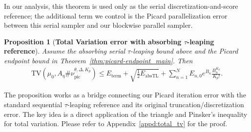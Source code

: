 \documentclass{article}
\newtheorem{proposition}{Proposition}[section]
\newcommand{\TV}{\mathrm{TV}}
\begin{document}
In our analysis, this theorem is used only as the serial discretization-and-score reference; the additional term we control is the Picard parallelization error between this serial sampler and our blockwise parallel sampler.

\begin{proposition}[\bf Total Variation error with absorbing $\tau$-leaping reference]
\label{prop:total-tv_main}
Assume the absorbing serial $\tau$-leaping bound above and the Picard endpoint bound in Theorem~\ref{thm:picard-endpoint_main}.  Then
\[
\begin{aligned}
\TV(\mu_0,A_\eta\#\nu_{\mathrm{pic}}^{\theta,\Delta,K_p})
\le
E_{\mathrm{term}}+\sqrt{\frac12E_{\mathrm{absTL}}}+
\sum_{n=1}^N E_{n,0}e^{B_n}\frac{B_n^{K_p}}{K_p!}.
\end{aligned}
\]
\end{proposition}
The proposition works as a bridge connecting our Picard iteration error with the standard sequential $\tau$-leaping reference and its original truncation/discretization error. The key idea is a direct application of the triangle and Pinsker's inequality for total variation. Please refer to Appendix~\ref{appd:total_tv} for the proof. 
\end{document}
